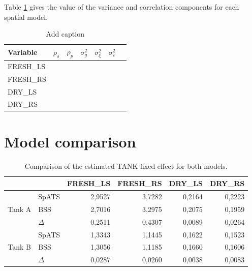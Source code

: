 %

Table \ref{tab:BSS_variance_values} gives the value of the variance and correlation components for each spatial model.

\begin{table}[htbp]
  \centering
  \caption{Add caption}
    \begin{tabular}{lrrrrrr}
    \toprule
    Variable & \multicolumn{1}{l}{$\rho_{s}$} & \multicolumn{1}{l}{$\rho_{p}$} & \multicolumn{1}{l}{$\sigma_{g}^{2}$} & \multicolumn{1}{l}{$\sigma_{\xi}^{2}$} & \multicolumn{1}{l}{$\sigma_{\varepsilon}^{2}$} &  \\
    \midrule
    FRESH\_LS &       &       &       &       &       &  \\
    FRESH\_RS &       &       &       &       &       &  \\
    DRY\_LS &       &       &       &       &       &  \\
    DRY\_RS &       &       &       &       &       &  \\
    \bottomrule
    \end{tabular}%
  \label{tab:BSS_variance_values}%
\end{table}%



\section{Model comparison}

\begin{table}[htbp]
  \centering
  \caption{Comparison of the estimated TANK fixed effect for both models.}
    \begin{tabular}{clrrrr}
    \toprule
          &       & \multicolumn{1}{l}{FRESH\_LS} & \multicolumn{1}{l}{FRESH\_RS} & \multicolumn{1}{l}{DRY\_LS} & \multicolumn{1}{l}{DRY\_RS} \\
    \midrule
    \multirow{3}[1]{*}{Tank A} & SpATS & 2,9527 & 3,7282 & 0,2164 & 0,2223 \\
          & BSS   & 2,7016 & 3,2975 & 0,2075 & 0,1959 \\
          & $\Delta$ & 0,2511 & 0,4307 & 0,0089 & 0,0264 \\
    \midrule
    \multirow{3}[1]{*}{Tank B} & SpATS & 1,3343 & 1,1445 & 0,1622 & 0,1523 \\
          & BSS   & 1,3056 & 1,1185 & 0,1660 & 0,1606 \\
          & $\Delta$ & 0,0287 & 0,0260 & 0,0038 & 0,0083 \\
    \bottomrule
    \end{tabular}%

  \label{tab:tank_effect_model_comparison}%
\end{table}%



